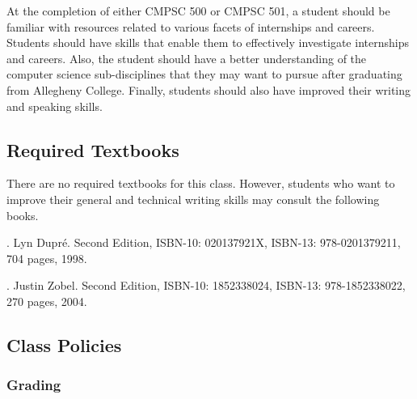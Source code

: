 At the completion of either CMPSC 500 or CMPSC 501, a student should be familiar with resources related to various facets of
internships and careers. Students should have skills that enable them to effectively investigate internships and
careers.  Also, the student should have a better understanding of the computer science sub-disciplines that they may
want to pursue after graduating from Allegheny College. Finally, students should also have improved their writing and
speaking skills.

\subsection*{Required Textbooks}

\noindent
There are no required textbooks for this class.  However, students who want to improve their general and technical writing skills
may consult the following books.

. Lyn Dupr\'e. Second Edition,  ISBN-10: 020137921X,
ISBN-13: 978-0201379211, 704 pages, 1998.

.  Justin Zobel. Second Edition,  ISBN-10: 1852338024, ISBN-13:
978-1852338022, 270 pages, 2004.

\subsection*{Class Policies}

\subsubsection*{Grading}

% 
% 

